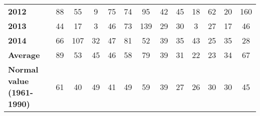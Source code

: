 \documentclass[a4paper,9pt,fleqn]{article}
\begin{document}
\begin{table}
\begin{tabularx}{14cm}{X|cccccc|cccccc}
{\bf 2012}    & 88        & 55        & 9         & 75        & 74        & 95        & 42        & 45        & 18        & 62        & 20        & 160       \\
{\bf 2013}    & 44        & 17        & 3         & 46        & 73        & 139       & 29        & 30        & 3         & 27        & 17        & 46        \\
{\bf 2014}    & 66        & 107       & 32        & 47        & 81        & 52        & 39        & 35        & 43        & 25        & 35        & 28        \\ \hline
{\bf Average} & 89        & 53        & 45        & 46        & 58        & 79        & 39        & 31        & 22        & 23        & 34        & 67        \\ \hline
{\bf Normal value \newline
(1961-1990)}  & 61        & 40        & 49        & 41        & 49        & 59        & 39        & 27        & 26        & 30        & 30        & 45 \\
\end{tabularx}
\vspace{0.5cm}


\end{table}
\end{document}
